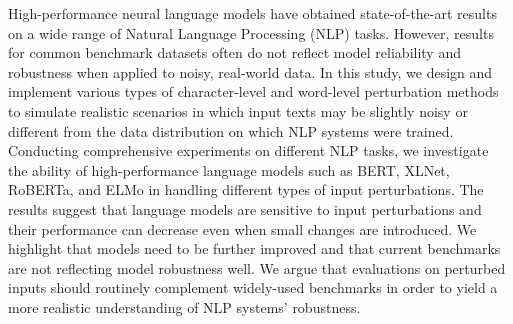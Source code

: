 High-performance neural language models have obtained state-of-the-art results on a wide range of Natural Language Processing (NLP) tasks. However, results for common benchmark datasets often do not reflect model reliability and robustness when applied to noisy, real-world data. In this study, we design and implement various types of character-level and word-level perturbation methods to simulate realistic scenarios in which input texts may be slightly noisy or different from the data distribution on which NLP systems were trained. Conducting comprehensive experiments on different NLP tasks, we investigate the ability of high-performance language models such as BERT, XLNet, RoBERTa, and ELMo in handling different types of input perturbations. The results suggest that language models are sensitive to input perturbations and their performance can decrease even when small changes are introduced. We highlight that models need to be further improved and that current benchmarks are not reflecting model robustness well. We argue that evaluations on perturbed inputs should routinely complement widely-used benchmarks in order to yield a more realistic understanding of NLP systems' robustness.
